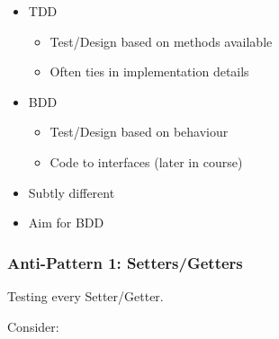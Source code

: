 \begin{itemize}
\itemsep1pt\parskip0pt
\item
  TDD

  \begin{itemize}
  \itemsep1pt\parskip0pt
  \item
    Test/Design based on methods available
  \item
    Often ties in implementation details
  \end{itemize}
\item
  BDD

  \begin{itemize}
  \itemsep1pt\parskip0pt
  \item
    Test/Design based on behaviour\\
  \item
    Code to interfaces (later in course)
  \end{itemize}
\item
  Subtly different
\item
  Aim for BDD
\end{itemize}

\subsubsection{Anti-Pattern 1:
Setters/Getters}\label{anti-pattern-1-settersgetters}

Testing every Setter/Getter.

Consider:

\begin{Shaded}
\begin{Highlighting}[]
    

     \NormalTok{:}
         
         \NormalTok{\{ } 
         
        \NormalTok{\{ } 
     \NormalTok{:}
        
   \NormalTok{\};}
\end{Highlighting}
\end{Shaded}

